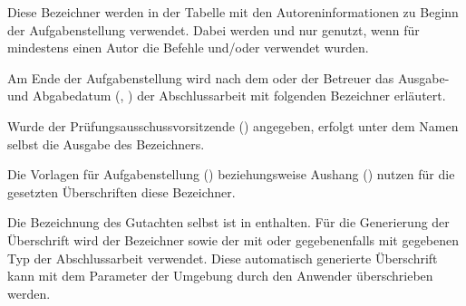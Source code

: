 \begin{Declaration*}{}
\begin{Declaration}{}
\begin{Declaration}{}
\begin{Declaration}{}
\begin{Declaration}[v2.02]{}
\printdeclarationlist%
%
Diese Bezeichner werden in der Tabelle mit den Autoreninformationen zu Beginn 
der Aufgabenstellung verwendet. Dabei werden  und 
 nur genutzt, wenn für mindestens einen Autor die Befehle 
 und/oder  verwendet wurden.
\end{Declaration}
\end{Declaration}
\end{Declaration}
\end{Declaration}

\begin{Declaration}{}
\begin{Declaration}{}
\printdeclarationlist%
%
Am Ende der Aufgabenstellung wird nach dem oder der Betreuer das Ausgabe- und 
Abgabedatum (, ) der Abschlussarbeit mit 
folgenden Bezeichner erläutert.
\end{Declaration}
\end{Declaration}

\begin{Declaration}{}
\printdeclarationlist%
%
Wurde der Prüfungsausschussvorsitzende () angegeben, erfolgt 
unter dem Namen selbst die Ausgabe des Bezeichners.
\end{Declaration}

\begin{Declaration}{}
\begin{Declaration}{}
\printdeclarationlist%
%
Die Vorlagen für Aufgabenstellung () beziehungsweise Aushang 
() nutzen für die gesetzten Überschriften diese Bezeichner.
\end{Declaration}
\end{Declaration}

\begin{Declaration}{}
\begin{Declaration}{}
\printdeclarationlist%
%
Die Bezeichnung des Gutachten selbst ist in  enthalten. 
Für die Generierung der Überschrift wird der Bezeichner  
sowie der mit  oder gegebenenfalls mit  gegebenen 
Typ der Abschlussarbeit verwendet. Diese automatisch generierte Überschrift 
kann mit dem Parameter  der 
Umgebung  durch den Anwender überschrieben werden.
\end{Declaration}
\end{Declaration}


\end{Declaration*}
